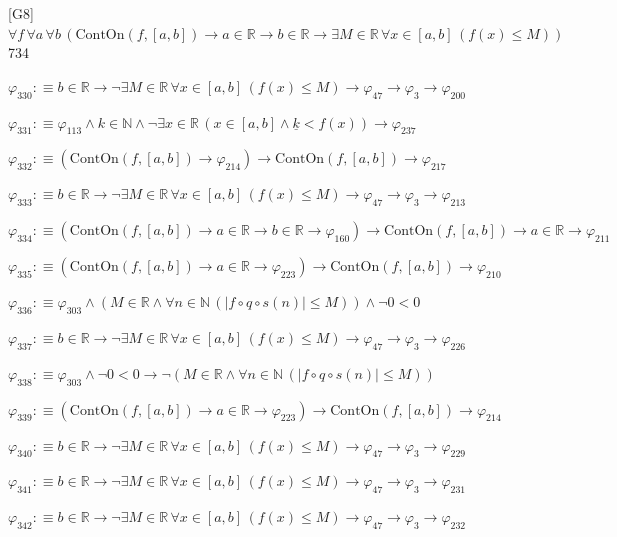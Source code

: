 \begin{fullproof}{[G8]}{$\forall f\,\forall a\,\forall b\,(\mathrm{ContOn}(f,[a,b]) \to a \in \mathbb{R} \to b \in \mathbb{R} \to \exists M \in \mathbb{R}\,\forall x \in [a,b]\,(f(x) \leq M))$}{734}
\begin{abbrevlist}
\item $\varphi_{330} :\equiv b \in \mathbb{R} \to \neg \exists M \in \mathbb{R}\,\forall x \in [a,b]\,(f(x) \leq M) \to \varphi_{47} \to \varphi_{3} \to \varphi_{200}$
\item $\varphi_{331} :\equiv \varphi_{113} \land k \in \mathbb{N} \land \neg \exists x \in \mathbb{R}\,(x \in [a,b] \land \underline{k} < f(x)) \to \varphi_{237}$
\item $\varphi_{332} :\equiv (\mathrm{ContOn}(f,[a,b]) \to \varphi_{214}) \to \mathrm{ContOn}(f,[a,b]) \to \varphi_{217}$
\item $\varphi_{333} :\equiv b \in \mathbb{R} \to \neg \exists M \in \mathbb{R}\,\forall x \in [a,b]\,(f(x) \leq M) \to \varphi_{47} \to \varphi_{3} \to \varphi_{213}$
\item $\varphi_{334} :\equiv (\mathrm{ContOn}(f,[a,b]) \to a \in \mathbb{R} \to b \in \mathbb{R} \to \varphi_{160}) \to \mathrm{ContOn}(f,[a,b]) \to a \in \mathbb{R} \to \varphi_{211}$
\item $\varphi_{335} :\equiv (\mathrm{ContOn}(f,[a,b]) \to a \in \mathbb{R} \to \varphi_{223}) \to \mathrm{ContOn}(f,[a,b]) \to \varphi_{210}$
\item $\varphi_{336} :\equiv \varphi_{303} \land (M \in \mathbb{R} \land \forall n \in \mathbb{N}\,(\lvert f \circ q \circ s(n) \rvert \leq M)) \land \neg 0 < 0$
\item $\varphi_{337} :\equiv b \in \mathbb{R} \to \neg \exists M \in \mathbb{R}\,\forall x \in [a,b]\,(f(x) \leq M) \to \varphi_{47} \to \varphi_{3} \to \varphi_{226}$
\item $\varphi_{338} :\equiv \varphi_{303} \land \neg 0 < 0 \to \neg (M \in \mathbb{R} \land \forall n \in \mathbb{N}\,(\lvert f \circ q \circ s(n) \rvert \leq M))$
\item $\varphi_{339} :\equiv (\mathrm{ContOn}(f,[a,b]) \to a \in \mathbb{R} \to \varphi_{223}) \to \mathrm{ContOn}(f,[a,b]) \to \varphi_{214}$
\item $\varphi_{340} :\equiv b \in \mathbb{R} \to \neg \exists M \in \mathbb{R}\,\forall x \in [a,b]\,(f(x) \leq M) \to \varphi_{47} \to \varphi_{3} \to \varphi_{229}$
\item $\varphi_{341} :\equiv b \in \mathbb{R} \to \neg \exists M \in \mathbb{R}\,\forall x \in [a,b]\,(f(x) \leq M) \to \varphi_{47} \to \varphi_{3} \to \varphi_{231}$
\item $\varphi_{342} :\equiv b \in \mathbb{R} \to \neg \exists M \in \mathbb{R}\,\forall x \in [a,b]\,(f(x) \leq M) \to \varphi_{47} \to \varphi_{3} \to \varphi_{232}$

\end{abbrevlist}
\end{fullproof}
